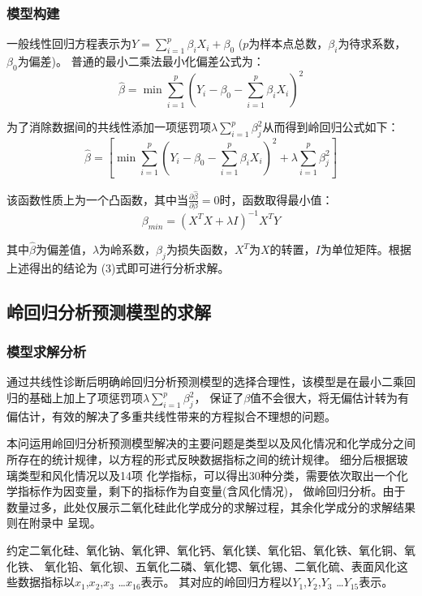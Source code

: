 \documentclass[UTF8]{ctexart}
\begin{document}
\subsubsection{模型构建}
一般线性回归方程表示为$Y=\sum_{i=1}^p \beta_i X_i + \beta_0$ ($p$为样本点总数，$\beta_i$为待求系数，$\beta_0$为偏差)。
普通的最小二乘法最小化偏差公式为：
\begin{equation}
	\hat{\beta } = \min \sum_{i=1}^p(Y_i-\beta_0 - \sum_{i=1}^p \beta_i X_i)^2
\end{equation}

为了消除数据间的共线性添加一项惩罚项$\lambda \sum_{i=1}^p \beta_{j}^2$从而得到岭回归公式如下：
\begin{equation}
	\hat{\beta } = [\min \sum_{i=1}^p(Y_i-\beta_0 - \sum_{i=1}^p \beta_i X_i)^2 + \lambda \sum_{i=1}^p \beta_{j}^2]
\end{equation}

该函数性质上为一个凸函数，其中当$\frac{\partial \widehat{\beta} }{\partial \beta}=0$时，函数取得最小值：
\begin{equation}
	\beta_{min} = (X^T X+\lambda I)^{-1} X^T Y
\end{equation}

其中$\hat{\beta }$为偏差值，$\lambda$为岭系数，$\beta_{j}$为损失函数，$X^T$为$X$的转置，$I$为单位矩阵。根据上述得出的结论为
(3)式即可进行分析求解。




\subsection{岭回归分析预测模型的求解}
\subsubsection{模型求解分析}
通过共线性诊断后明确岭回归分析预测模型的选择合理性，该模型是在最小二乘回归的基础上加上了项惩罚项$\lambda \sum_{i=1}^p \beta_{j}^2$，
保证了$\beta$值不会很大，将无偏估计转为有偏估计，有效的解决了多重共线性带来的方程拟合不理想的问题。

本问运用岭回归分析预测模型解决的主要问题是类型以及风化情况和化学成分之间所存在的统计规律，以方程的形式反映数据指标之间的统计规律。
细分后根据玻璃类型和风化情况以及14项
化学指标，可以得出30种分类，需要依次取出一个化学指标作为因变量，剩下的指标作为自变量(含风化情况)，
做岭回归分析。由于数量过多，此处仅展示二氧化硅此化学成分的求解过程，其余化学成分的求解结果则在附录中
呈现。

约定二氧化硅、氧化钠、氧化钾、氧化钙、氧化镁、氧化铝、氧化铁、氧化铜、氧化铁、
氧化铅、氧化钡、五氧化二磷、氧化锶、氧化锡、二氧化硫、表面风化这些数据指标以$x_1$,$x_2$,$x_3$ \dots $x_{16}$表示。
其对应的岭回归方程以$Y_1$,$Y_2$,$Y_3$ \dots $Y_{15}$表示。
\end{document}
